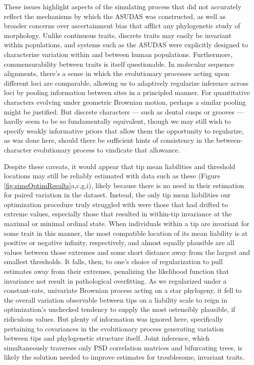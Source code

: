 These issues highlight aspects of the simulating process that did not accurately reflect the mechanisms by which the ASUDAS was constructed, as well as broader concerns over ascertainment bias that afflict any phylogenetic study of morphology. Unlike continuous traits, discrete traits may easily be invariant within populations, and systems such as the ASUDAS were explicitly designed to characterize variation within and between human populations. Furthermore, commensurability between traits is itself questionable. In molecular sequence alignments, there's a sense in which the evolutionary processes acting upon different loci are comparable, allowing us to adaptively regularize inference across loci by pooling information between sites in a principled manner. For quantitative characters evolving under geometric Brownian motion, perhaps a similar pooling might be justified. But discrete characters --- such as dental cusps or grooves --- hardly seem to be so fundamentally equivalent, though we may still wish to specify weakly informative priors that allow them the opportunity to regularize, as was done here, should there be sufficient hints of consistency in the between-character evolutionary process to vindicate that allowance.

Despite these caveats, it would appear that tip mean liabilities and threshold locations may still be reliably estimated with data such as these (Figure \ref{fig:simsOptimResults}a,c,g,i), likely because there is no need in their estimation for paired variation in the dataset. Instead, the only tip mean liabilities our optimization procedure truly struggled with were those that had drifted to extreme values, especially those that resulted in within-tip invariance at the maximal or minimal ordinal state. When individuals within a tip are invariant for some trait in this manner, the most compatible location of its mean liability is at positive or negative infinity, respectively, and almost equally plausible are all values between those extremes and some short distance away from the largest and smallest thresholds. It falls, then, to one's choice of regularization to pull estimates away from their extremes, penalizing the likelihood function that invariance not result in pathological overfitting. As we regularized under a constant-rate, univariate Brownian process acting on a star phylogeny, it fell to the overall variation observable between tips on a liability scale to reign in optimization's unchecked tendency to supply the most ostensibly plausible, if ridiculous values. But plenty of information was ignored here, specifically pertaining to covariances in the evolutionary process generating variation between tips and phylogenetic structure itself. Joint inference, which simultaneously traverses only PSD correlation matrices and bifurcating trees, is likely the solution needed to improve estimates for troublesome, invariant traits.

